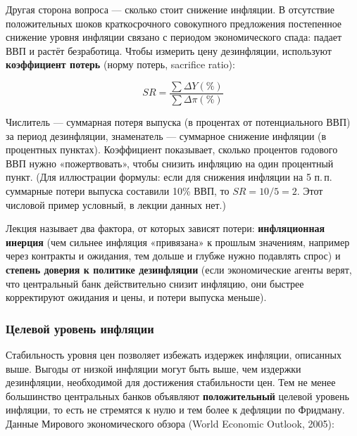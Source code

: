 \documentclass[11pt,a4paper]{article}
\begin{document}
Другая сторона вопроса --- сколько стоит снижение инфляции. В отсутствие положительных шоков краткосрочного совокупного предложения постепенное снижение уровня инфляции связано с периодом экономического спада: падает ВВП и растёт безработица. Чтобы измерить цену дезинфляции, используют \textbf{коэффициент потерь} (норму потерь, sacrifice ratio):
\begin{formulabox}
\begin{equation*}
SR=\frac{\sum\Delta Y(\%)}{\sum\Delta\pi(\%)}
\end{equation*}
\end{formulabox}
Числитель --- суммарная потеря выпуска (в процентах от потенциального ВВП) за период дезинфляции, знаменатель --- суммарное снижение инфляции (в процентных пунктах). Коэффициент показывает, сколько процентов годового ВВП нужно «пожертвовать», чтобы снизить инфляцию на один процентный пункт. (Для иллюстрации формулы: если для снижения инфляции на 5 п.\,п. суммарные потери выпуска составили 10\% ВВП, то $SR=10/5=2$. Этот числовой пример условный, в лекции данных нет.)

Лекция называет два фактора, от которых зависят потери: \textbf{инфляционная инерция} (чем сильнее инфляция «привязана» к прошлым значениям, например через контракты и ожидания, тем дольше и глубже нужно подавлять спрос) и \textbf{степень доверия к политике дезинфляции} (если экономические агенты верят, что центральный банк действительно снизит инфляцию, они быстрее корректируют ожидания и цены, и потери выпуска меньше).

\subsubsection{Целевой уровень инфляции}

Стабильность уровня цен позволяет избежать издержек инфляции, описанных выше. Выгоды от низкой инфляции могут быть выше, чем издержки дезинфляции, необходимой для достижения стабильности цен. Тем не менее большинство центральных банков объявляют \textbf{положительный} целевой уровень инфляции, то есть не стремятся к нулю и тем более к дефляции по Фридману. Данные Мирового экономического обзора (World Economic Outlook, 2005):
\end{document}
